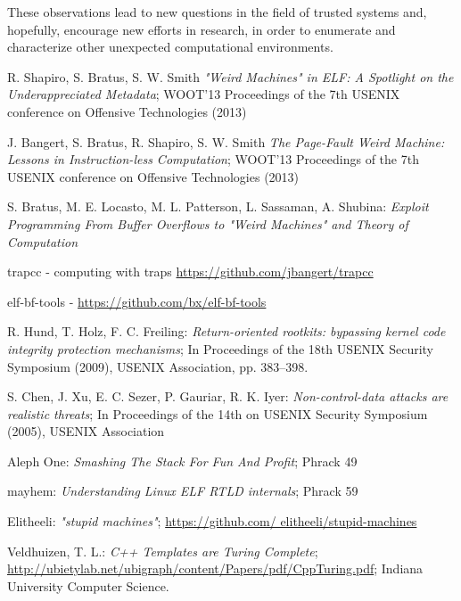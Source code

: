 \documentclass[11pt,twoside,a4paper]{article}
\begin{document}
These observations lead to new questions in the field of trusted systems and, hopefully, encourage new efforts in research, in order to enumerate and characterize other unexpected computational environments.

\begin{thebibliography}{12}
 R. Shapiro, S. Bratus, S. W. Smith {\sl "Weird Machines" in ELF: A Spotlight on the Underappreciated Metadata}; WOOT'13 Proceedings of the 7th USENIX conference on Offensive Technologies (2013)

 J. Bangert, S. Bratus, R. Shapiro, S. W. Smith {\sl The Page-Fault Weird Machine: Lessons in Instruction-less Computation};  WOOT'13 Proceedings of the 7th USENIX conference on Offensive Technologies (2013)

 S. Bratus, M. E. Locasto, M. L. Patterson, L. Sassaman, A. Shubina: {\sl Exploit Programming From Buffer Overflows to "Weird Machines" and Theory of Computation}

 trapcc - computing with traps \url{https://github.com/jbangert/trapcc}

 elf-bf-tools - \url{https://github.com/bx/elf-bf-tools}

 R. Hund, T. Holz, F. C. Freiling: {\sl Return-oriented rootkits: bypassing kernel code integrity protection mechanisms}; In Proceedings of the 18th USENIX Security Symposium (2009), USENIX Association, pp. 383–398.

 S. Chen, J. Xu, E. C. Sezer, P. Gauriar, R. K. Iyer: {\sl Non-control-data attacks are realistic threats}; In Proceedings of the 14th on USENIX Security Symposium (2005), USENIX Association

 Aleph One: {\sl Smashing The Stack For Fun And Profit}; Phrack 49

 mayhem: {\sl Understanding Linux ELF RTLD internals}; Phrack 59

 Elitheeli: {\sl "stupid machines"}; \url{https://github.com/ elitheeli/stupid-machines}

 Veldhuizen, T. L.:  {\sl C++ Templates are Turing Complete}; \url{http://ubietylab.net/ubigraph/content/Papers/pdf/CppTuring.pdf}; Indiana University Computer Science.
\end{thebibliography}
\end{document}
